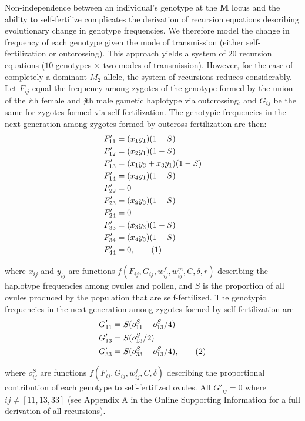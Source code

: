 \documentclass[9pt,twocolumn,twoside,lineno]{gsajnl}
\newcommand\numberthis{\addtocounter{equation}{1}\tag{\theequation}}
\begin{document}
Non-independence between an individual's genotype at the $\mathbf{M}$ locus and the ability to self-fertilize complicates the derivation of recursion equations describing evolutionary change in genotype frequencies. We therefore model the change in frequency of each genotype given the mode of transmission (either self-fertilization or outcrossing). This approach yields a system of $20$ recursion equations ($10$ genotypes $\times$ two modes of transmission). However, for the case of completely a dominant $M_2$ allele, the system of recursions reduces considerably. Let $F_{ij}$ equal the frequency among zygotes of the genotype formed by the union of the \textit{i}th female and \textit{j}th male gametic haplotype via outcrossing, and $G_{ij}$ be the same for zygotes formed via self-fertilization. The genotypic frequencies in the next generation among zygotes formed by outcross fertilization are then:
\begin{align*} \label{eq:Fprimes}
    F'_{11} &= (x_1 y_1) (1 - S) \\
    F'_{12} &= (x_2 y_1) (1 - S) \\
    F'_{13} &= (x_1 y_3 + x_3 y_1) (1 - S) \\
    F'_{14} &= (x_4 y_1) (1 - S) \\
    F'_{22} &= 0 \\
    F'_{23} &= (x_2 y_3) (1 - S) \\
    F'_{24} &= 0 \\
    F'_{33} &= (x_3 y_3) (1 - S) \\
    F'_{34} &= (x_4 y_3) (1 - S) \\
    F'_{44} &= 0, \numberthis
\end{align*}

\noindent where $x_{ij}$ and $y_{ij}$ are functions $f(F_{ij},G_{ij},w^f_{ij},w^m_{ij},C,\delta,r)$ describing the haplotype frequencies among ovules and pollen, and $S$ is the proportion of all ovules produced by the population that are self-fertilized. The genotypic frequencies in the next generation among zygotes formed by self-fertilization are 
\begin{align*} \label{eq:Gprimes}
    G'_{11} &= S (o^S_{11} + o^S_{13}/4) \\
    G'_{13} &= S (o^S_{13}/2) \\
    G'_{33} &= S (o^S_{33} + o^S_{13}/4), \numberthis
\end{align*}

\noindent where $o^S_{ij}$ are functions $f(F_{ij},G_{ij},w^f_{ij},C,\delta)$ describing the proportional contribution of each genotype to self-fertilized ovules. All $G'_{ij} = 0$ where $ij \neq [11,13,33]$ (see Appendix A in the Online Supporting Information for a full derivation of all recursions). 
\end{document}
